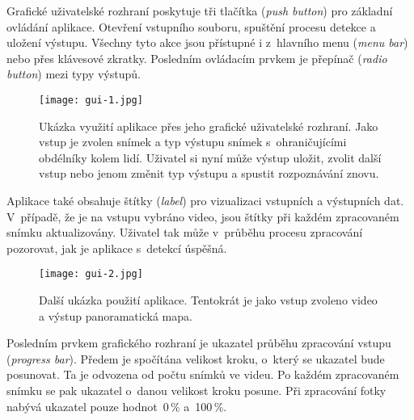 Grafické uživatelské rozhraní poskytuje tři tlačítka (\textit{push button}) pro základní ovládání aplikace. Otevření vstupního souboru, spuštění procesu detekce a uložení výstupu. Všechny tyto akce jsou přístupné i z~hlavního menu (\textit{menu bar}) nebo přes klávesové zkratky. Posledním ovládacím prvkem je přepínač (\textit{radio button}) mezi typy výstupů.

\begin{figure}[H]
    \centering
    \texttt{[image: gui-1.jpg]}
    \caption[Ukázka grafického rozhraní aplikace People Detector]{Ukázka využití aplikace přes jeho grafické uživatelské rozhraní. Jako vstup je zvolen snímek a typ výstupu snímek s~ohraničujícími obdélníky kolem lidí. Uživatel si nyní může výstup uložit, zvolit další vstup nebo jenom změnit typ výstupu a spustit rozpoznávání znovu.}
    \label{fig_gui-1}
\end{figure}

Aplikace také obsahuje štítky (\textit{label}) pro vizualizaci vstupních a výstupních dat. V~případě, že je na vstupu vybráno video, jsou štítky při každém zpracovaném snímku aktualizovány. Uživatel tak může v~průběhu procesu zpracování pozorovat, jak je aplikace s~detekcí úspěšná.

\begin{figure}[H]
    \centering
    \texttt{[image: gui-2.jpg]}
    \caption[Další ukázka grafického rozhraní aplikace People Detector]{Další ukázka použití aplikace. Tentokrát je jako vstup zvoleno video a výstup panoramatická mapa.}
    \label{fig_gui-2}
\end{figure}

Posledním prvkem grafického rozhraní je ukazatel průběhu zpracování vstupu (\textit{progress bar}). Předem je spočítána velikost kroku, o~který se ukazatel bude posunovat. Ta je odvozena od počtu snímků ve videu. Po každém zpracovaném snímku se pak ukazatel o~danou velikost kroku posune. Při zpracování fotky nabývá ukazatel pouze hodnot~0\,\% a~100\,\%.

